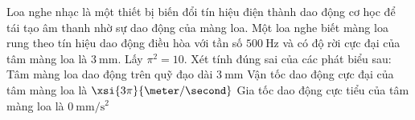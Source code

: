 \begin{ex}
	Loa nghe nhạc là một thiết bị biến đổi tín hiệu điện thành dao động cơ học để tái tạo âm thanh nhờ sự dao động của màng loa. Một loa nghe biết màng loa rung theo tín hiệu dao động điều hòa với tần số $\SI{500}{\hertz}$ và có độ rời cực đại của tâm màng loa là $\SI{3}{\milli\meter}$. Lấy $\pi^2=10$. Xét tính đúng sai của các phát biểu sau:
	{\True Tâm màng loa dao động trên quỹ đạo dài $\SI{3}{\milli\meter}$}
	{Vận tốc dao động cực đại của tâm màng loa là $\xsi{3\pi}{\meter/\second}$}
	{Gia tốc dao động cực tiểu của tâm màng loa là $\SI{0}{\milli\meter/\second^2}$}
\end{ex}

